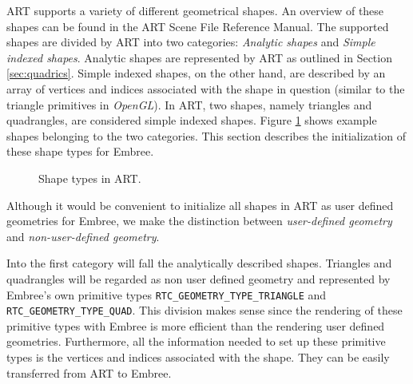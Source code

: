 ART supports a variety of different geometrical shapes. An overview of these shapes can be found in the ART Scene File Reference Manual. The supported shapes are divided by ART into two categories: \emph{Analytic shapes} and \emph{Simple indexed shapes}. Analytic shapes are represented by ART as outlined in Section \ref{sec:quadrics}. Simple indexed shapes, on the other hand, are described by an array of vertices and indices associated with the shape in question (similar to the triangle primitives in \emph{OpenGL}). In ART, two shapes, namely triangles and quadrangles, are considered simple indexed shapes. Figure \ref{fig:shape_types} shows example shapes belonging to the two categories. 
This section describes the initialization of these shape types for Embree.


\begin{figure}[!tbp]
	\centering
	\hfil
	\caption{Shape types in ART.}
	\label{fig:shape_types}
\end{figure}

Although it would be convenient to initialize all shapes in ART as user defined geometries for Embree, we make the distinction between \emph{user-defined geometry} and \emph{non-user-defined geometry}.

Into the first category will fall the analytically described shapes. Triangles and quadrangles will be regarded as non user defined geometry and represented by Embree's own primitive types \texttt{RTC\_GEOMETRY\_TYPE\_TRIANGLE} and \texttt{RTC\_GEOMETRY\_TYPE\_QUAD}. This division makes sense since the rendering of these primitive types with Embree is more efficient than the rendering user defined geometries. Furthermore, all the information needed to set up these primitive types is the vertices and indices associated with the shape. They can be easily transferred from ART to Embree. 

